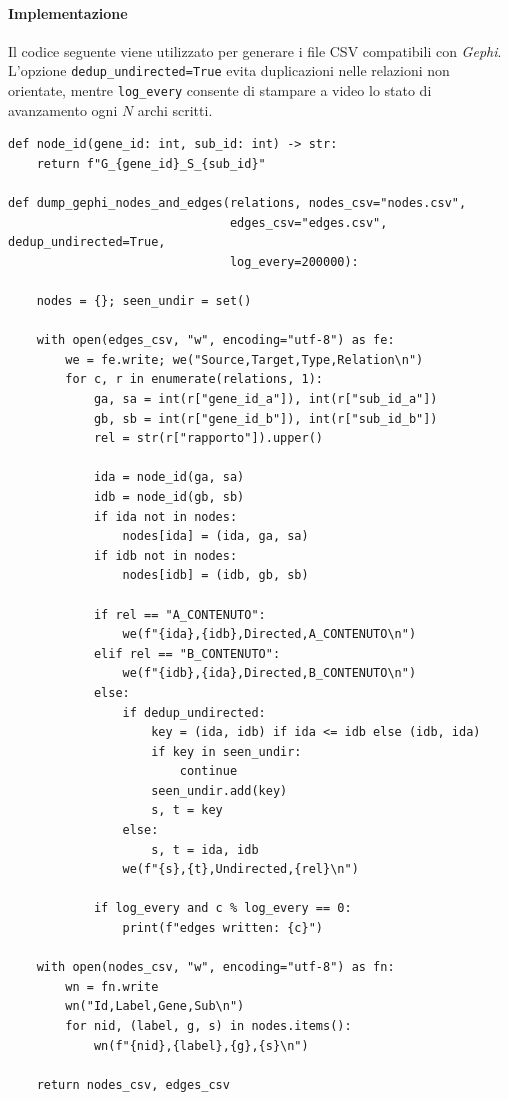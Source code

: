 \paragraph{Implementazione\\}
Il codice seguente viene utilizzato per generare i file CSV compatibili con \textit{Gephi}.
L'opzione \texttt{dedup\_undirected=True} evita duplicazioni nelle relazioni non orientate, mentre
\texttt{log\_every} consente di stampare a video lo stato di avanzamento ogni $N$ archi scritti.

\begin{lstlisting}[style=mypython,
                   label=code:NN,
                   caption={Creazione CSV grafi},
                   basicstyle=\ttfamily\scriptsize]
def node_id(gene_id: int, sub_id: int) -> str:
    return f"G_{gene_id}_S_{sub_id}"

def dump_gephi_nodes_and_edges(relations, nodes_csv="nodes.csv", 
                               edges_csv="edges.csv", dedup_undirected=True, 
                               log_every=200000):
    
    nodes = {}; seen_undir = set()

    with open(edges_csv, "w", encoding="utf-8") as fe:
        we = fe.write; we("Source,Target,Type,Relation\n")
        for c, r in enumerate(relations, 1):
            ga, sa = int(r["gene_id_a"]), int(r["sub_id_a"])
            gb, sb = int(r["gene_id_b"]), int(r["sub_id_b"])
            rel = str(r["rapporto"]).upper()

            ida = node_id(ga, sa)
            idb = node_id(gb, sb)
            if ida not in nodes:
                nodes[ida] = (ida, ga, sa) 
            if idb not in nodes:
                nodes[idb] = (idb, gb, sb)

            if rel == "A_CONTENUTO":
                we(f"{ida},{idb},Directed,A_CONTENUTO\n")
            elif rel == "B_CONTENUTO":
                we(f"{idb},{ida},Directed,B_CONTENUTO\n")
            else:
                if dedup_undirected:
                    key = (ida, idb) if ida <= idb else (idb, ida)
                    if key in seen_undir:
                        continue
                    seen_undir.add(key)
                    s, t = key
                else:
                    s, t = ida, idb
                we(f"{s},{t},Undirected,{rel}\n")

            if log_every and c % log_every == 0:
                print(f"edges written: {c}")

    with open(nodes_csv, "w", encoding="utf-8") as fn:
        wn = fn.write
        wn("Id,Label,Gene,Sub\n")
        for nid, (label, g, s) in nodes.items():
            wn(f"{nid},{label},{g},{s}\n")

    return nodes_csv, edges_csv
\end{lstlisting}

